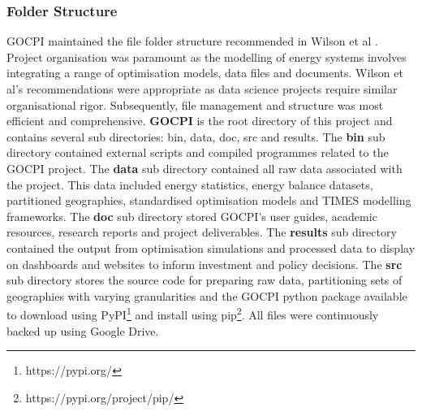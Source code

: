 \documentclass[10pt]{article}
\begin{document}
\subsubsection{Folder Structure}
GOCPI maintained the file folder structure recommended in Wilson et al \cite{J:10}. 
Project organisation was paramount as the modelling of energy systems involves integrating a range of optimisation models, data files and documents. 
Wilson et al's recommendations were appropriate as data science projects require similar organisational rigor. 
Subsequently, file management and structure was most efficient and comprehensive. \textbf{GOCPI} is the root directory of this project and contains several sub directories: bin, data, doc, src and results.  
The \textbf{bin} sub directory contained external scripts and compiled programmes related to the GOCPI project. 
The \textbf{data} sub directory contained all raw data associated with the project. 
This data included energy statistics, energy balance datasets, partitioned geographies, standardised optimisation models and TIMES modelling frameworks.
The \textbf{doc} sub directory stored GOCPI's user guides, academic resources, research reports and project deliverables.
The \textbf{results} sub directory contained the output from optimisation simulations and processed data to display on dashboards and websites to inform investment and policy decisions.
The \textbf{src} sub directory stores the source code for preparing raw data, partitioning sets of geographies with varying granularities and the GOCPI python package available to download using PyPI\footnote[2]{https://pypi.org/} and install using pip\footnote[3]{https://pypi.org/project/pip/}.
All files were continuously backed up using Google Drive.
\end{document}
